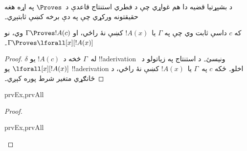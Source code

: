\documentclass[../../../include/open-logic-section]{subfiles}
\begin{document}


\begin{explain}
  د بشپړتيا قضيه دا هم غواړي چې د فطري استنتاج قاعدې د~$\Proves$
  په اړه هغه حقيقتونه ورکړي چې په دې برخه کښې ثابتېږي۔
\end{explain}

\begin{thm}
 که $c$ داسې ثابت وي چې په
$\Gamma$ يا~$!A(x)$ کښې نۀ راځي، او $\Gamma \Proves !A(c)$ وي، نو
$\Gamma \Proves \lforall[x][!A(x)]$۔
\end{thm}

\begin{proof}
$\delta$ له~$\Gamma$ څخه د~$!A(c)$ يو !!a{derivation} ونيسئ۔ د
\Intro{\lforall} استنتاج په زياتولو د~$\lforall[x][!A(x)]$ يو
!!a{derivation} اخلو۔ ځکه $c$ په~$\Gamma$ يا~$!A(x)$ کښې نۀ راځي،
د ځانګړي متغير شرط پوره کېږي۔
\end{proof}

\begin{prop}
\begin{tagenumerate}{prvEx,prvAll}

\end{tagenumerate}
\end{prop}

\begin{proof}
\begin{tagenumerate}{prvEx,prvAll}

\end{tagenumerate}
\end{proof}
\end{document}

